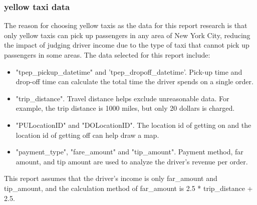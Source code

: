 \documentclass[11pt]{article}
\begin{document}
\subsubsection {yellow taxi data\cite{3}}
The reason for choosing yellow taxis as the data for this report research is that only yellow taxis can pick up passengers in any area of New York City, reducing the impact of judging driver income due to the type of taxi that cannot pick up passengers in some areas. The data selected for this report include:
\begin{itemize}
    \item "tpep\_pickup\_datetime" and 'tpep\_dropoff\_datetime'. Pick-up time and drop-off time can calculate the total time the driver spends on a single order.
\end{itemize}
\begin{itemize}
    \item "trip\_distance". Travel distance helps exclude unreasonable data. For example, the trip distance is 1000 miles, but only 20 dollars is charged.
\end{itemize}
\begin{itemize}
    \item "PULocationID" and "DOLocationID". The location id of getting on and the location id of getting off can help draw a map.
\end{itemize}
\begin{itemize}
    \item "payment\_type", "fare\_amount" and "tip\_amount". Payment method, far amount, and tip amount are used to analyze the driver's revenue per order.
\end{itemize}
This report assumes that the driver's income is only far\_amount and tip\_amount, and the calculation method of far\_amount is 2.5 * trip\_distance + 2.5.\cite{4}
\end{document}
